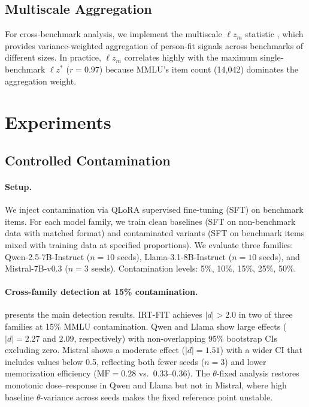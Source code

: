 \documentclass[11pt,a4paper]{article}
\begin{document}
\subsection{Multiscale Aggregation}

For cross-benchmark analysis, we implement the multiscale $\ell z_m$ statistic \citep{hong2021multiscale}, which provides variance-weighted aggregation of person-fit signals across benchmarks of different sizes.
In practice, $\ell z_m$ correlates highly with the maximum single-benchmark $\ell z^*$ ($r{=}0.97$) because MMLU's item count (14,042) dominates the aggregation weight.

\section{Experiments}
\label{sec:experiments}

\subsection{Controlled Contamination}
\label{sec:ctrl-contam}

\paragraph{Setup.}
We inject contamination via QLoRA supervised fine-tuning (SFT) on benchmark items.
For each model family, we train clean baselines (SFT on non-benchmark data with matched format) and contaminated variants (SFT on benchmark items mixed with training data at specified proportions).
We evaluate three families: Qwen-2.5-7B-Instruct ($n{=}10$ seeds), Llama-3.1-8B-Instruct ($n{=}10$ seeds), and Mistral-7B-v0.3 ($n{=}3$ seeds).
Contamination levels: 5\%, 10\%, 15\%, 25\%, 50\%.

\paragraph{Cross-family detection at 15\% contamination.}
 presents the main detection results.
\textsc{IRT-FIT} achieves $|d|{>}2.0$ in two of three families at 15\% MMLU contamination.
Qwen and Llama show large effects ($|d|{=}2.27$ and $2.09$, respectively) with non-overlapping 95\% bootstrap CIs excluding zero.
Mistral shows a moderate effect ($|d|{=}1.51$) with a wider CI that includes values below 0.5, reflecting both fewer seeds ($n{=}3$) and lower memorization efficiency ($\text{MF}{=}0.28$ vs.\ 0.33--0.36).
The $\theta$-fixed analysis restores monotonic dose--response in Qwen and Llama but not in Mistral, where high baseline $\theta$-variance across seeds makes the fixed reference point unstable.
\end{document}
